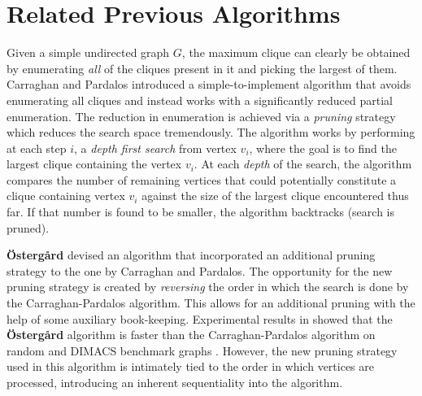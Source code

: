 \section{Related Previous Algorithms}
\label{sec:relatedwork}

Given a simple undirected graph $G$, the maximum clique can clearly be obtained by enumerating 
{\em all} of the cliques present in it and picking the largest of them.
Carraghan and Pardalos \cite{pardalos} introduced a simple-to-implement
algorithm that avoids enumerating all cliques and instead
works with a significantly reduced partial enumeration.
The reduction in enumeration is achieved via 
a {\em pruning} strategy which reduces the search space tremendously.
The algorithm works by
performing at each step $i$, a {\em depth first search} from vertex $v_i$, 
where the goal is to find the largest clique containing the vertex $v_i$.
At each {\em depth} of the search, the algorithm compares the number of remaining
vertices that could potentially constitute a clique containing vertex $v_i$
against the size of the largest clique encountered thus far.
If that number is found to be smaller, the algorithm backtracks (search is pruned).

{\bf \"{O}sterg{\aa}rd} \cite{ostergard} devised an algorithm that incorporated an additional 
pruning strategy to the one by Carraghan and Pardalos.
The opportunity for the new pruning strategy is created by {\em reversing} the order in which the search is done by
the Carraghan-Pardalos algorithm. This allows for an additional pruning with the help of
some auxiliary book-keeping. 
Experimental results in \cite{ostergard} showed that the {\bf \"{O}sterg{\aa}rd}
algorithm is faster than the Carraghan-Pardalos algorithm on random and 
DIMACS benchmark graphs \cite{dimacs}.
However, the new pruning strategy used in this algorithm is intimately tied to the order in which vertices are processed, introducing an inherent sequentiality into the algorithm.

